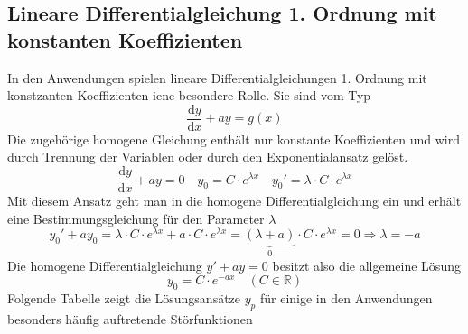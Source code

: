 \subsection{Lineare Differentialgleichung 1. Ordnung mit konstanten Koeffizienten} 
In den Anwendungen spielen lineare Differentialgleichungen 1. Ordnung mit konstzanten Koeffizienten iene besondere Rolle. Sie sind vom Typ
\begin{equation}
\boxed{\dfrac{\text{d}y}{\text{d}x}+ay=g\left(x\right)}
\end{equation}
Die zugehörige homogene Gleichung enthält nur konstante Koeffizienten und wird durch Trennung der Variablen oder durch den Exponentialansatz gelöst.
\begin{equation}
\boxed{\dfrac{\text{d}y}{\text{d}x}+ay=0}\quad \boxed{y_0=C\cdot e^{\lambda x}}\quad \boxed{y_0'=\lambda \cdot C \cdot e^{\lambda x}}
\end{equation}
Mit diesem Ansatz geht man in die homogene Differentialgleichung ein und erhält eine Bestimmungsgleichung für den Parameter $\lambda$
\begin{equation}
\boxed{y_0'+ay_0=\lambda \cdot C\cdot e^{\lambda x}+a\cdot C\cdot e^{\lambda x}=\underbrace{\left(\lambda + a\right)}_{0}\cdot C\cdot e^{\lambda x}=0\Longrightarrow \lambda = -a}
\end{equation}
Die homogene Differentialgleichung $y'+ay=0$ besitzt also die allgemeine Lösung
\begin{equation}  
\boxed{y_0=C\cdot e^{-ax}\quad \left(C\in \mathbb{R}\right)}
\end{equation}  
Folgende Tabelle zeigt die Lösungsansätze $y_p$ für einige in den Anwendungen besonders häufig auftretende Störfunktionen
